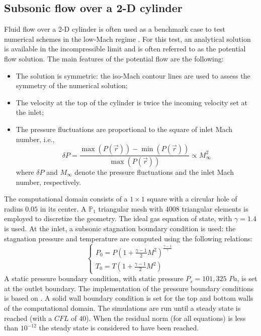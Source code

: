 \documentclass[preprint,10pt]{elsarticle}
\begin{document}
\subsection{Subsonic flow over a 2-D cylinder} \label{sec:cylinder}

Fluid flow over a 2-D cylinder is often used as a benchmark case to test numerical schemes in the 
low-Mach regime \cite{LowMach1, LowMach2, LowMach3}. For this test, an analytical solution is available 
in the incompressible limit and is often referred to as the potential flow solution. 
The main features of the potential flow are the following:
%
\begin{itemize}
\item The solution is symmetric: the iso-Mach contour lines are used to assess the symmetry of the numerical solution;
\item The velocity at the top of the cylinder is twice the incoming velocity set at the inlet;
\item The pressure fluctuations are proportional to the square of inlet Mach number, i.e., 
\begin{equation}
\delta P = \frac{\max(P(\vec{r})) - \min(P(\vec{r}))}{\max(P(\vec{r}))}  \propto M_\infty^2
\end{equation}
where $\delta P$ and $M_\infty$ denote the pressure fluctuations and the inlet Mach number, respectively.
\end{itemize}
%
The computational domain consists of a $1\times 1$ square with a circular hole of radius $0.05$ in its center. 
A $\mathbb{P}_1$ triangular mesh with $4008$ triangular elements is employed to discretize the geometry. 
The ideal gas equation of state, with $\gamma=1.4$ is used. At the inlet, a subsonic stagnation boundary 
condition is used: the stagnation pressure and temperature are computed using the following relations:
%
\begin{equation}
\label{eq:stagnation_relations}
\left\{
\begin{array}{l}
P_0 = P\left( 1 + \frac{\gamma-1}{2} M^2 \right)^{\frac{\gamma-1}{\gamma}} \\
T_0 = T\left( 1 + \frac{\gamma-1}{2} M^2 \right)
\end{array}
\right.
\end{equation}
%
A static pressure boundary condition, with static pressure $P_s = 101,325$ $Pa$, is set at the outlet boundary. 
The implementation of the pressure boundary conditions is based on \cite{SEM}. A solid wall boundary condition 
is set for the top and bottom walls of the computational domain. The simulations are run until a steady state 
is reached (with a $CFL$ of $40$). When the residual norm (for all equations) is less than $10^{-12}$ the 
steady state is considered to have been reached.
\end{document}
